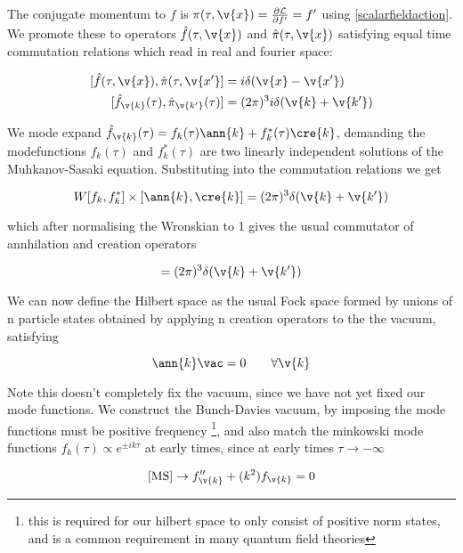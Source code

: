 The conjugate momentum to $f$ is $\pi(\tau, \v{x}) =  \frac{\partial \mathcal{L}}{\partial f'} = f'$ using \ref{scalarfieldaction}. We promote these to operators $\hat{f}(\tau, \v{x})$ and $\hat{\pi}(\tau, \v{x})$ satisfying equal time commutation relations which read in real and fourier space:

\begin{equation}\begin{split}
[\hat{f}(\tau, \v{x}), \hat{\pi}(\tau, \v{x'}] &= i\delta(\v{x}-\v{x'}) \\
[\hat{f}_{\v{k}}(\tau), \hat{\pi}_{\v{k'}}(\tau)] &= (2\pi)^3i\delta(\v{k}+\v{k'})
\end{split}\end{equation}

We mode expand $\hat{f}_{\v{k}}(\tau) = f_k(\tau)\ann{k}+f_k^*(\tau)\cre{k}$, demanding the modefunctions $f_k(\tau)$ and $f_k^*(\tau)$ are two linearly independent solutions of the Muhkanov-Sasaki equation. Substituting into the commutation relations we get 

\begin{equation}
W[f_k,f_k^*]\times[\ann{k}, \cre{k}] = (2\pi)^3\delta(\v{k}+\v{k'})
\end{equation}

which after normalising the Wronskian to 1 gives the usual commutator of annhilation and creation operators

\begin{equation}
[\ann{k}, \cre{k}] = (2\pi)^3\delta(\v{k}+\v{k'})
\end{equation}

We can now define the Hilbert space as the usual Fock space formed by unions of n particle states obtained by applying n creation operators to the the vacuum, satisfying 

\begin{equation}
\ann{k}\vac =0 \qquad \forall \v{k}
\end{equation}

Note this doesn't completely fix the vacuum, since we have not yet fixed our mode functions. We construct the Bunch-Davies vacuum, by imposing the mode functions must be positive frequency \footnote{this is required for our hilbert space to only consist of positive norm states, and is a common requirement in many quantum field theories}, and also match the minkowski mode functions $f_k(\tau) \propto e^{\pm ik\tau}$ at early times, since at early times $\tau \rightarrow -\infty$

\begin{equation}
\ref{MS} \rightarrow  f''_{\v{k}} + (k^2)f_{\v{k}} = 0
\end{equation}

